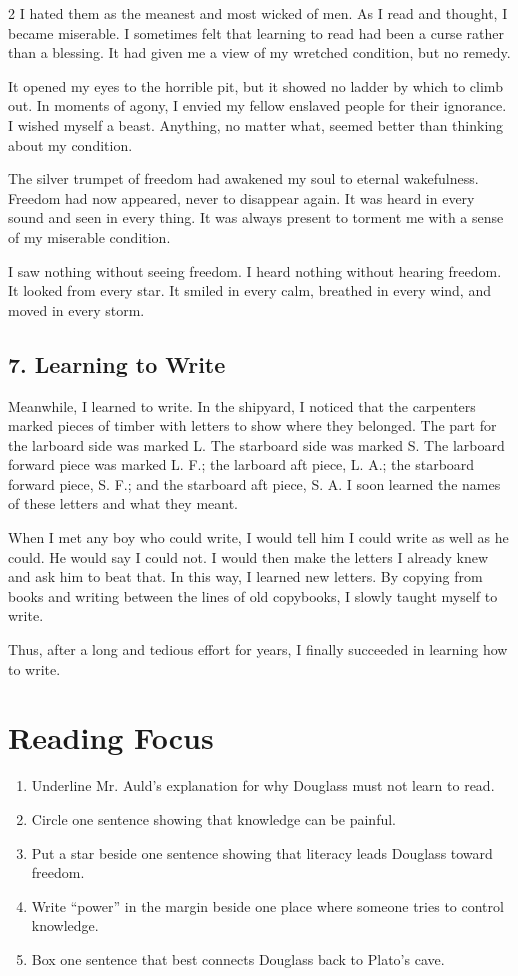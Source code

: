 \documentclass[12pt]{article}
\begin{document}
\begin{multicols}{2}
I hated them as the meanest and most wicked of men. As I read and thought, I became miserable. I sometimes felt that learning to read had been a curse rather than a blessing. It had given me a view of my wretched condition, but no remedy.

It opened my eyes to the horrible pit, but it showed no ladder by which to climb out. In moments of agony, I envied my fellow enslaved people for their ignorance. I wished myself a beast. Anything, no matter what, seemed better than thinking about my condition.

The silver trumpet of freedom had awakened my soul to eternal wakefulness. Freedom had now appeared, never to disappear again. It was heard in every sound and seen in every thing. It was always present to torment me with a sense of my miserable condition.

I saw nothing without seeing freedom. I heard nothing without hearing freedom. It looked from every star. It smiled in every calm, breathed in every wind, and moved in every storm.

\subsection*{7. Learning to Write}
Meanwhile, I learned to write. In the shipyard, I noticed that the carpenters marked pieces of timber with letters to show where they belonged. The part for the larboard side was marked L. The starboard side was marked S. The larboard forward piece was marked L. F.; the larboard aft piece, L. A.; the starboard forward piece, S. F.; and the starboard aft piece, S. A. I soon learned the names of these letters and what they meant.

When I met any boy who could write, I would tell him I could write as well as he could. He would say I could not. I would then make the letters I already knew and ask him to beat that. In this way, I learned new letters. By copying from books and writing between the lines of old copybooks, I slowly taught myself to write.

Thus, after a long and tedious effort for years, I finally succeeded in learning how to write.

\section*{Reading Focus}
\begin{enumerate}[leftmargin=*, itemsep=0.2em]
\item Underline Mr. Auld's explanation for why Douglass must not learn to read.
\item Circle one sentence showing that knowledge can be painful.
\item Put a star beside one sentence showing that literacy leads Douglass toward freedom.
\item Write ``power'' in the margin beside one place where someone tries to control knowledge.
\item Box one sentence that best connects Douglass back to Plato's cave.
\end{enumerate}


\end{multicols}
\end{document}
